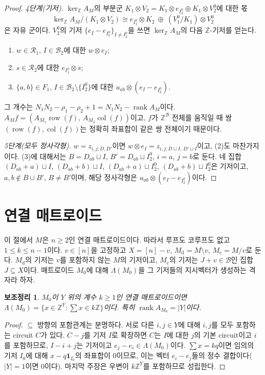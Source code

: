 \documentclass[11pt,a4paper]{article}
\theoremstyle{plain}
\newtheorem{lemma}[theorem]{보조정리}
\theoremstyle{definition}
\newcommand{\Z}{\mathbb Z}
\newcommand{\AM}{A_M}
\newcommand{\kerZ}{\ker_{\Z}\!A_M}
\newcommand{\bs}{\mathcal B}
\newcommand{\rank}{\operatorname{rank}}
\newcommand{\ind}{\mathbf 1}
\begin{document}
\begin{proof}
\emph{4단계(기저).} $\kerZ$의 부분군 $K_1\otimes V_2=K_1\otimes e_{I_2^0}\oplus K_1\otimes V_2^0$에 대한 몫
\[
\kerZ/(K_1\otimes V_2)\cong e_{I_1^0}\otimes K_2\ \oplus\ (V_1^0/K_1)\otimes V_2^0
\]
은 자유 군이다. $V_2^0$의 기저 $\{e_I-e_{I_2^0}\}_{I\ne I_2^0}$을 쓰면 $\kerZ$의 다음 $\Z$\nobreakdash-기저를 얻는다.
\begin{enumerate}[label=(\arabic*),itemsep=1pt]
\item $w\in\mathcal R_1$, $I\in\bs_2$에 대한 $w\otimes e_I$;
\item $s\in\mathcal R_2$에 대한 $e_{I_1^0}\otimes s$;
\item $\{a,b\}\in F_1$, $I\in\bs_2\setminus\{I_2^0\}$에 대한 $u_{ab}\otimes(e_I-e_{I_2^0})$.
\end{enumerate}
그 개수는 $N_1N_2-\rho_1-\rho_2+1=N_1N_2-\rank\AM$이다. $\AM f=(A_{M_1}\operatorname{row}(f),\,A_{M_2}\operatorname{col}(f))$이고, $f$가 $\Z^{\bs}$ 전체를 움직일 때 쌍 $(\operatorname{row}(f),\operatorname{col}(f))$는 정확히 좌표합이 같은 쌍 전체이기 때문이다.

\emph{5단계(모두 정사각형).} $w=z_{i,j;D,D'}$이면 $w\otimes e_I=z_{i,j;D\sqcup I,\,D'\sqcup I}$이고, (2)도 마찬가지이다. (3)에 대해서는 $B=D_{ab}\sqcup I$, $B'=D_{ab}\sqcup I_2^0$, $i=a$, $j=b$로 둔다. 네 집합 $(D_{ab}+a)\sqcup I$, $(D_{ab}+b)\sqcup I$, $(D_{ab}+a)\sqcup I_2^0$, $(D_{ab}+b)\sqcup I_2^0$은 기저이고, $a,b\notin B\cup B'$, $B\ne B'$이며, 해당 정사각형은 $u_{ab}\otimes(e_I-e_{I_2^0})$이다.
\end{proof}

\section{연결 매트로이드}\label{sec:conn}
이 절에서 $M$은 $n\ge2$인 연결 매트로이드이다. 따라서 루프도 코루프도 없고 $1\le k\le n-1$이다. $v\in[n]$을 고정하고 $X=[n]-v$, $M_{\mathrm d}=M\setminus v$, $M_{\mathrm c}=M/v$로 둔다. $M_{\mathrm d}$의 기저는 $v$를 포함하지 않는 $M$의 기저이고, $M_{\mathrm c}$의 기저는 $J+v\in\bs$인 집합 $J\subseteq X$이다. 매트로이드 $M_0$에 대해 $\Lambda(M_0)$을 그 기저들의 지시벡터가 생성하는 격자라 하자.

\begin{lemma}\label{lem:lat}
$M_0$이 $Y$ 위의 계수 $k\ge1$인 연결 매트로이드이면 $\Lambda(M_0)=\{x\in\Z^Y:\sum x\in k\Z\}$이다. 특히 $\rank A_{M_0}=|Y|$이다.
\end{lemma}
\begin{proof}
$\subseteq$ 방향의 포함관계는 분명하다. 서로 다른 $i,j\in Y$에 대해 $i,j$를 모두 포함하는 circuit $C$가 있다. $C-j$를 기저 $I$로 확장하면 $C$는 $I$에 대한 $j$의 기본 circuit이고 $i$를 포함하므로, $I-i+j$는 기저이고 $e_j-e_i\in\Lambda(M_0)$이다. $\sum x=kq$이면 임의의 기저 $I_0$에 대해 $x-q\ind_{I_0}$의 좌표합이 $0$이므로, 이는 벡터 $e_i-e_j$들의 정수 결합이다($|Y|=1$이면 $0$이다). 마지막 주장은 우변이 $k\Z^Y$를 포함하므로 성립한다.
\end{proof}
\end{document}
